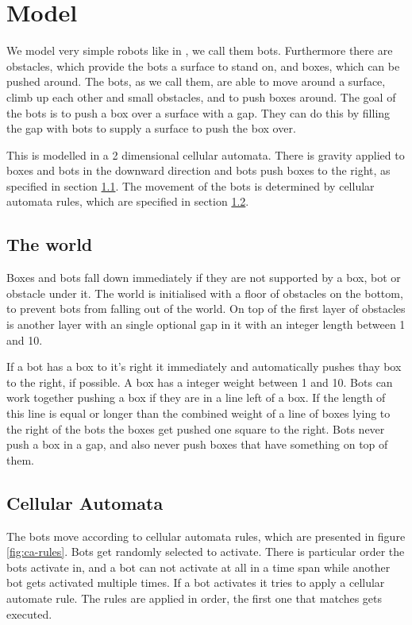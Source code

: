 \section{Model}
\label{sec:model}

We model very simple robots like in \cite{butler02}, we call them bots. Furthermore there are
obstacles, which provide the bots a surface to stand on, and boxes, which can be
pushed around. The bots, as we call them, are able to move around a surface,
climb up each other and small obstacles, and to push boxes around. The goal of
the bots is to push a box over a surface with a gap. They can do this by filling
the gap with bots to supply a surface to push the box over.

This is modelled in a 2 dimensional cellular automata. There is gravity
applied to boxes and bots in the downward direction and bots push boxes to the
right, as specified in section \ref{sec:world}. The movement of the bots is
determined by cellular automata rules, which are specified in section
\ref{sec:ca-rules}.


\subsection{The world}
\label{sec:world}
Boxes and bots fall down immediately if they are not supported by a box, bot or
obstacle under it. The world is initialised with a floor of obstacles on the
bottom, to prevent bots from falling out of the world. On top of the first layer
of obstacles is another layer with an single optional gap in it with an integer
length between 1 and 10.

If a bot  has a box to it's right it immediately and automatically pushes thay box to the
right, if possible. A box has a integer weight between 1 and 10. Bots can work
together pushing a box if they are in a line left of a box. If the length of
this line is equal or longer than the combined weight of a line of boxes lying
to the right of the bots the boxes get pushed one square to the right. Bots
never push a box in a gap, and also never push boxes that have something on top
of them.

\subsection{Cellular Automata}
\label{sec:ca-rules}
The bots move according to cellular automata rules, which are presented in figure
\ref{fig:ca-rules}. Bots get randomly selected to activate. There is particular
order the bots activate in, and a bot can not activate at all in a time
span while another bot gets activated multiple times. If a bot activates it tries
to apply a cellular automate rule. The rules are applied in order, the first one
that matches gets executed.

